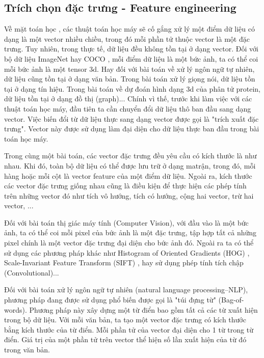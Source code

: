 \documentclass[../DoAn.tex]{subfiles}
\begin{document}
\subsection{Trích chọn đặc trưng - Feature engineering}
Về mặt toán học , các thuật toán học máy sẽ cố gắng xử lý một điểm dữ liệu có dạng là một vector nhiều chiều, trong đó mỗi phần tử thuộc vector là một đặc trưng. Tuy nhiên, trong thực tế, dữ liệu đều không tồn tại ở dạng vector. Đối với bộ dữ liệu ImageNet \cite{deng2009imagenet} hay COCO \cite{lin2014microsoft} , mỗi điểm dữ liệu là một bức ảnh, ta có thể coi mỗi bức ảnh là một tensor 3d. Hay đối với bài toán về xử lý ngôn ngữ tự nhiên, dữ liệu cũng tồn tại ở dạng văn bản. Trong bài toán xử lý giọng nói, dữ liệu tồn tại ở dạng tín hiệu. Trong bài toán về dự đoán hình dạng 3d của phân tử protein, dữ liệu tồn tại ở dạng đồ thị (graph)... Chính vì thế, trước khi làm việc với các thuật toán học máy, đầu tiên ta cần chuyển đổi dữ liệu thô ban đầu sang dạng vector. Việc biến đổi từ dữ liệu thực sang dạng vector được gọi là "trích xuất đặc trưng". Vector này được sử dụng làm đại diện cho dữ liệu thực ban đầu trong bài toán học máy. 

Trong cùng một bài toán, các vector đặc trưng đều yêu cầu có kích thước là như nhau. Khi đó, toàn bộ dữ liệu có thể được lưu trữ ở dạng matrận, trong đó, mỗi hàng hoặc mỗi cột là vector feature của một điểm dữ liệu. Ngoài ra, kích thước các vector đặc trưng giống nhau cũng là điều kiện để thực hiện các phép tính trên những vector đó như tích vô hướng, tích có hướng, cộng hai vector, trừ hai vector, ... 

Đối với bài toán thị giác máy tính (Computer Vision), với đầu vào là một bức ảnh, ta có thể coi mỗi pixel của bức ảnh là một đặc trưng, tập hợp tất cả những pixel chính là một vector đặc trưng đại diện cho bức ảnh đó. Ngoài ra ta có thể sử dụng các phương pháp khác như Histogram of Oriented Gradients (HOG) \cite{1467360}, Scale-Invariant Feature Transform (SIFT) \cite{sift}, hay sử dụng phép tính tích chập (Convolutional)...

Đối với bài toán xử lý ngôn ngữ tự nhiên (natural language processing–NLP), phương pháp đang được sử dụng phổ biến được gọi là "túi đựng từ" (Bag-of-words). Phương pháp này xây dựng một từ điển bao gồm tất cả các từ xuất hiện trong bộ dữ liệu. Với mỗi văn bản, ta tạo một vector đặc trưng có kích thước bằng kích thước của từ điển. Mỗi phần tử của vector đại diện cho 1 từ trong từ điển. Giá trị của một phần tử trên vector thể hiện số lần xuất hiện của từ đó trong văn bản.
\end{document}
